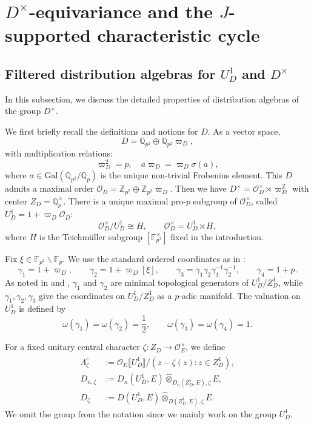 \documentclass[11pt]{article}
\theoremstyle{definition}
\newcommand{\F}{\mathbb F}
\newcommand{\cO}{\mathcal O}
\begin{document}
\section{\texorpdfstring{$D^\times$}{D-times}-equivariance and the \texorpdfstring{$J$}{J}-supported characteristic cycle}
\label{sec:equivariance}

\subsection{Filtered distribution algebras for \texorpdfstring{$U_D^1$}{UD1} and \texorpdfstring{$D^\times$}{D-times}}
\label{sec:D-equivariance}

In this subsection, we discuss the detailed properties of distribution algebras of the group $D^\times$. 

We first briefly recall the definitions and notions for $D$.
As a vector space, \[D=\mathbb{Q}_{p^2}\oplus\mathbb{Q}_{p^2}\varpi_D,\] with multiplication relations: \[ \varpi_D^2=p,\quad a\varpi_D=\varpi_D\sigma(a),\]
where $\sigma\in\mathrm{Gal}(\mathbb{Q}_{p^2}/\mathbb{Q}_p)$ is the unique non-trivial Frobenius element.
This $D$ admits a maximal order $\mathcal{O}_D=\mathbb{Z}_{p^2}\oplus\mathbb{Z}_{p^2}\varpi_D$. 
Then we have $D^\times=\cO_D^\times\rtimes\varpi_D^\mathbb{Z}$ with center $Z_D=\mathbb{Q}_p^\times$. There is a unique maximal pro-$p$ subgroup of $\cO_D^\times$, called $U_D^1=1+\varpi_D\cO_D$:
\[
 \cO_D^\times/U_D^1\cong H,\qquad \cO_D^\times=U_D^1\rtimes H,
\]
where $H$ is the Teichm\"uller subgroup $[\mathbb{F}_{p^2}^\times]$ fixed in the introduction.

Fix $\xi\in\F_{p^2}\backslash\F_p$. We use the standard ordered coordinates as in \cite{HuWangModP}:
\[
 \gamma_1=1+\varpi_D,
 \qquad
 \gamma_2=1+\varpi_D[\xi],
 \qquad
 \gamma_3=\gamma_1\gamma_2\gamma_1^{-1}\gamma_2^{-1},
 \qquad
 \gamma_4=1+p.
\]
As noted in \cite{HuWangModP} and \cite{Lazard1965}, $\gamma_1$ and $\gamma_2$ are minimal topological generators of $U_D^1/Z_D^1$, while $\gamma_1, \gamma_2, \gamma_3$ give the coordinates on $U_D^1/Z_D^1$ as a $p$-adic manifold.
The valuation on $U_D^1$ is defined by 
\[\omega(\gamma_1)=\omega(\gamma_2)=\frac{1}{2},\qquad\omega(\gamma_3)=\omega(\gamma_4)=1.\]


For a fixed unitary central character $\zeta:Z_D\to\cO_E^\times$, we define 
\begin{align*}
 \Lambda_\zeta^\circ
 &:=\cO_E\llbracket U_D^1\rrbracket/
   \overline{(z-\zeta(z):z\in Z_D^1)},\\
    D_{n,\zeta}
 &:=D_n(U_D^1,E)\widehat\otimes_{D_n(Z_D^1,E),\zeta}E,\\
 D_\zeta
 &:=D(U_D^1,E)\widehat\otimes_{D(Z_D^1,E),\zeta}E.
\end{align*}
We omit the group from the notation since we mainly work on the group $U_D^1$.
\end{document}
